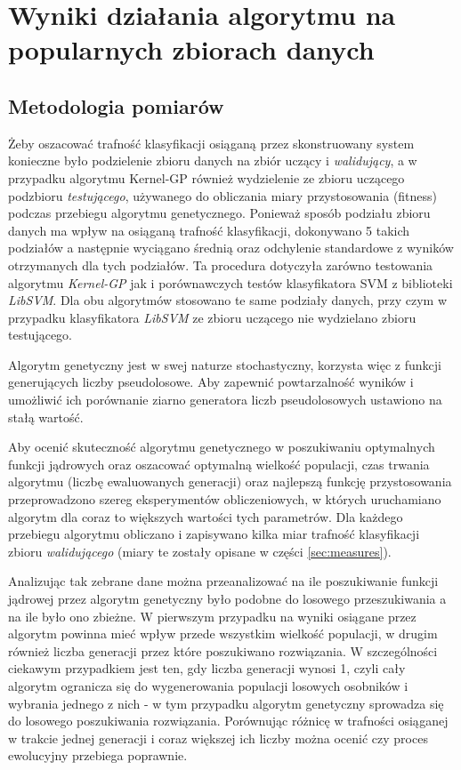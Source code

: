 
\chapter{Wyniki działania algorytmu na popularnych zbiorach danych}

\section{Metodologia pomiarów}
	Żeby oszacować trafność klasyfikacji osiąganą przez skonstruowany system konieczne było podzielenie zbioru danych na zbiór uczący i \emph{walidujący}, a w przypadku algorytmu Kernel-GP również wydzielenie ze zbioru uczącego podzbioru \emph{testującego}, używanego do obliczania miary przystosowania (fitness) podczas przebiegu algorytmu genetycznego. Ponieważ sposób podziału zbioru danych ma wpływ na osiąganą trafność klasyfikacji, dokonywano 5 takich podziałów a następnie wyciągano średnią oraz odchylenie standardowe z wyników otrzymanych dla tych podziałów. Ta procedura dotyczyła zarówno testowania algorytmu \emph{Kernel-GP} jak i porównawczych testów klasyfikatora SVM z biblioteki \emph{LibSVM}. Dla obu algorytmów stosowano te same podziały danych, przy czym w przypadku klasyfikatora \emph{LibSVM} ze zbioru uczącego nie wydzielano zbioru testującego.
	
	Algorytm genetyczny jest w swej naturze stochastyczny, korzysta więc z funkcji generujących liczby pseudolosowe. Aby zapewnić powtarzalność wyników i umożliwić ich porównanie ziarno generatora liczb pseudolosowych ustawiono na stałą wartość.

	Aby ocenić skuteczność algorytmu genetycznego w poszukiwaniu optymalnych funkcji jądrowych oraz oszacować optymalną wielkość populacji, czas trwania algorytmu (liczbę ewaluowanych generacji) oraz najlepszą funkcję przystosowania przeprowadzono szereg eksperymentów obliczeniowych, w których uruchamiano algorytm dla coraz to większych wartości tych parametrów. Dla każdego przebiegu algorytmu obliczano i zapisywano kilka miar trafność klasyfikacji zbioru \emph{walidującego} (miary te zostały opisane w części \ref{sec:measures}).

	Analizując tak zebrane dane można przeanalizować na ile poszukiwanie funkcji jądrowej przez algorytm genetyczny było podobne do losowego przeszukiwania a na ile było ono zbieżne. W pierwszym przypadku na wyniki osiągane przez algorytm powinna mieć wpływ przede wszystkim wielkość populacji, w drugim również liczba generacji przez które poszukiwano rozwiązania. W szczególności ciekawym przypadkiem jest ten, gdy liczba generacji wynosi 1, czyli cały algorytm ogranicza się do wygenerowania populacji losowych osobników i wybrania jednego z nich - w tym przypadku algorytm genetyczny sprowadza się do losowego poszukiwania rozwiązania. Porównując różnicę w trafności osiąganej w trakcie jednej generacji i coraz większej ich liczby można ocenić czy proces ewolucyjny przebiega poprawnie. 
	
